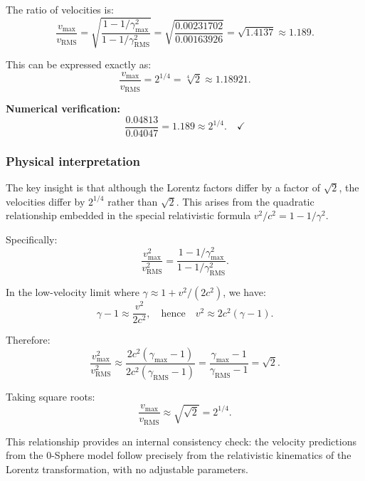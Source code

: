 \documentclass[12pt,letterpaper]{article}
\begin{document}
The ratio of velocities is:
\begin{equation}
\frac{v_{\max}}{v_{\mathrm{RMS}}} = \sqrt{\frac{1 - 1/\gamma_{\max}^2}{1 - 1/\gamma_{\mathrm{RMS}}^2}} = \sqrt{\frac{0.00231702}{0.00163926}} = \sqrt{1.4137} \approx 1.189.
\end{equation}

This can be expressed exactly as:
\begin{equation}
\frac{v_{\max}}{v_{\mathrm{RMS}}} = 2^{1/4} = \sqrt[4]{2} \approx 1.18921.
\end{equation}

\textbf{Numerical verification:}
\begin{equation}
\frac{0.04813}{0.04047} = 1.189 \approx 2^{1/4}. \quad \checkmark
\end{equation}

\subsubsection{Physical interpretation}

The key insight is that although the Lorentz factors differ by a factor of $\sqrt{2}$, the velocities differ by $2^{1/4}$ rather than $\sqrt{2}$. This arises from the quadratic relationship embedded in the special relativistic formula $v^2/c^2 = 1 - 1/\gamma^2$.

Specifically:
\begin{equation}
\frac{v_{\max}^2}{v_{\mathrm{RMS}}^2} = \frac{1 - 1/\gamma_{\max}^2}{1 - 1/\gamma_{\mathrm{RMS}}^2}.
\end{equation}

In the low-velocity limit where $\gamma \approx 1 + v^2/(2c^2)$, we have:
\begin{equation}
\gamma - 1 \approx \frac{v^2}{2c^2}, \quad \text{hence} \quad v^2 \approx 2c^2(\gamma - 1).
\end{equation}

Therefore:
\begin{equation}
\frac{v_{\max}^2}{v_{\mathrm{RMS}}^2} \approx \frac{2c^2(\gamma_{\max} - 1)}{2c^2(\gamma_{\mathrm{RMS}} - 1)} = \frac{\gamma_{\max} - 1}{\gamma_{\mathrm{RMS}} - 1} = \sqrt{2}.
\end{equation}

Taking square roots:
\begin{equation}
\frac{v_{\max}}{v_{\mathrm{RMS}}} \approx \sqrt{\sqrt{2}} = 2^{1/4}.
\end{equation}

This relationship provides an internal consistency check: the velocity predictions from the 0-Sphere model follow precisely from the relativistic kinematics of the Lorentz transformation, with no adjustable parameters.
\end{document}

